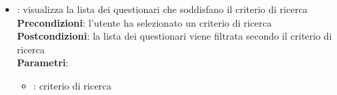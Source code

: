 \begin{itemize}
\begin{itemize}
\begin{itemize}
				\end{itemize}
		\item{}: visualizza la lista dei questionari che soddisfano il criterio di ricerca \\
			\textbf{Precondizioni}: l'utente ha selezionato un criterio di ricerca\\
			\textbf{Postcondizioni}: la lista dei questionari viene filtrata secondo il criterio di ricerca\\
			\textbf{Parametri}:
				\begin{itemize}
					\item{}: criterio di ricerca\\
				\end{itemize}
	\end{itemize}
\end{itemize}

